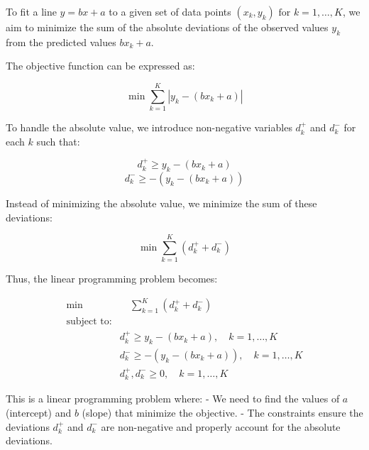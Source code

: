 \documentclass{article}
\begin{document}
To fit a line \( y = bx + a \) to a given set of data points \((x_k, y_k) \text{ for } k = 1, \ldots, K\), we aim to minimize the sum of the absolute deviations of the observed values \( y_k \) from the predicted values \( bx_k + a \).

The objective function can be expressed as:

\[
\min \sum_{k=1}^{K} |y_k - (bx_k + a)|
\]

To handle the absolute value, we introduce non-negative variables \( d_k^+ \) and \( d_k^- \) for each \( k \) such that:

\[
d_k^+ \geq y_k - (bx_k + a)
\]
\[
d_k^- \geq -(y_k - (bx_k + a))
\]

Instead of minimizing the absolute value, we minimize the sum of these deviations:

\[
\min \sum_{k=1}^{K} (d_k^+ + d_k^-)
\]

Thus, the linear programming problem becomes:

\[
\begin{align*}
\min & \quad \sum_{k=1}^{K} (d_k^+ + d_k^-) \\
\text{subject to:} & \\
& d_k^+ \geq y_k - (bx_k + a), \quad k = 1, \ldots, K \\
& d_k^- \geq -(y_k - (bx_k + a)), \quad k = 1, \ldots, K \\
& d_k^+, d_k^- \geq 0, \quad k = 1, \ldots, K
\end{align*}
\]

This is a linear programming problem where:
- We need to find the values of \( a \) (intercept) and \( b \) (slope) that minimize the objective.
- The constraints ensure the deviations \( d_k^+ \) and \( d_k^- \) are non-negative and properly account for the absolute deviations.
\end{document}
